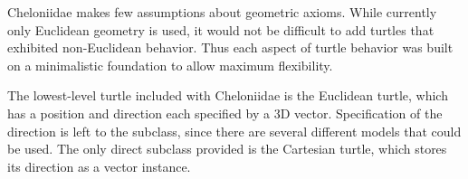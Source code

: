 \documentclass{article}
\begin{document}
      Cheloniidae makes few assumptions about geometric axioms. While currently only Euclidean geometry is used, it would not be difficult to add turtles that
      exhibited non-Euclidean behavior. Thus each aspect of turtle behavior was built on a minimalistic foundation to allow maximum flexibility.

      The lowest-level turtle included with Cheloniidae is the Euclidean turtle, which has a position and direction each specified by a 3D vector. Specification
      of the direction is left to the subclass, since there are several different models that could be used. The only direct subclass provided is the Cartesian
      turtle, which stores its direction as a vector instance.
\end{document}
